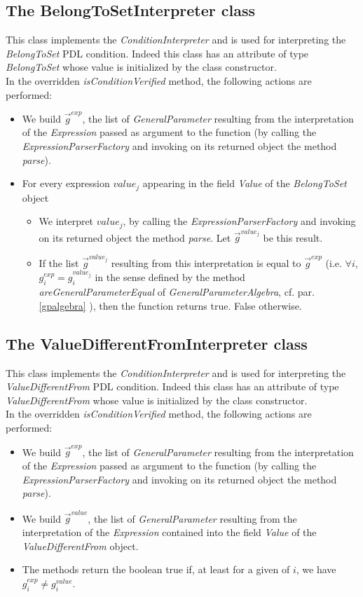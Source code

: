 \documentclass[a4paper,11pt] {ivoa}
\begin{document}
\subsection{The BelongToSetInterpreter class}
This class implements the  {\it ConditionInterpreter} and is used for interpreting the {\it BelongToSet} PDL condition. Indeed this class has an attribute of type {\it BelongToSet} whose value is initialized by the class constructor. \\
In the overridden {\it isConditionVerified} method, the following actions are performed:
\begin{itemize}
\item We build $\vec g^{exp}$, the list of {\it GeneralParameter} resulting from the interpretation of the {\it Expression} passed as argument to the function (by calling the {\it ExpressionParserFactory} and invoking on its returned object the method {\it parse}).
\item For every expression $value_j$ appearing in the field {\it Value} of the {\it BelongToSet} object
\begin{itemize}
\item  We interpret $value_j$, by calling the {\it ExpressionParserFactory} and invoking on its returned object the method {\it parse}. Let $\vec g^{value_j}$ be this result.
\item If the list $\vec g^{value_j}$ resulting from this interpretation is equal to $\vec g^{exp}$ (i.e. $\forall i$, $g_i^{exp}=g_i^{value_j}$ in the sense defined by the method {\it areGeneralParameterEqual} of {\it GeneralParameterAlgebra}, cf. par. \ref{gpalgebra} ), then the function returns true. False otherwise. 
\end{itemize}
\end{itemize}

\subsection{The ValueDifferentFromInterpreter class}
This class  implements the  {\it ConditionInterpreter} and is used for interpreting the {\it ValueDifferentFrom} PDL condition. Indeed this class has an attribute of type {\it ValueDifferentFrom} whose value is initialized by the class constructor. \\
In the overridden {\it isConditionVerified} method, the following actions are performed:
\begin{itemize}
\item We build $\vec g^{exp}$, the list of {\it GeneralParameter} resulting from the interpretation of the {\it Expression} passed as argument to the function (by calling the {\it ExpressionParserFactory} and invoking on its returned object the method {\it parse}). 
\item We build $\vec g^{value}$, the list of  {\it GeneralParameter} resulting from the interpretation of the {\it Expression} contained into the field {\it Value} of the  {\it ValueDifferentFrom} object.
\item The methods return the boolean true if, at least for a given of $i$, we have $g_i^{exp} \neq g_i^{value}$.
\end{itemize}
\end{document}
